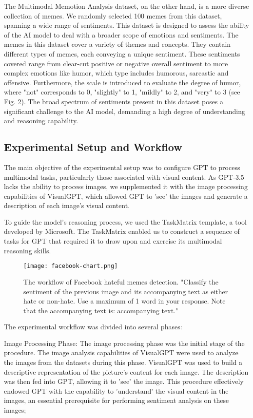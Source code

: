 \documentclass[conference]{IEEEtran}
\begin{document}
The Multimodal Memotion Analysis dataset, on the other hand, is a more diverse collection of memes. We randomly selected 100 memes from this dataset, spanning a wide range of sentiments. This dataset is designed to assess the ability of the AI model to deal with a broader scope of emotions and sentiments. The memes in this dataset cover a variety of themes and concepts. They contain different types of memes, each conveying a unique sentiment. These sentiments covered range from clear-cut positive or negative overall sentiment to more complex emotions like humor, which type includes humorous, sarcastic and offensive. Furthermore, the scale is introduced to evaluate the degree of humor, where "not" corresponds to 0, "slightly" to 1, "mildly" to 2, and "very" to 3 (see Fig. 2). The broad spectrum of sentiments present in this dataset poses a significant challenge to the AI model, demanding a high degree of understanding and reasoning capability.

\subsection{Experimental Setup and Workflow}
 The main objective of the experimental setup was to configure GPT to process multimodal tasks, particularly those associated with visual content. As GPT-3.5 lacks the ability to process images, we supplemented it with the image processing capabilities of VisualGPT, which allowed GPT to 'see' the images and generate a description of each image's visual content.

To guide the model's reasoning process, we used the TaskMatrix template, a tool developed by Microsoft. The TaskMatrix enabled us to construct a sequence of tasks for GPT that required it to draw upon and exercise its multimodal reasoning skills.

\begin{figure}[htbp]
\centerline{\texttt{[image: facebook-chart.png]}}
\caption{The workflow of Facebook hateful memes detection. "Classify the sentiment of the previous image and its accompanying text as either hate or non-hate. Use a maximum of 1 word in your response. Note that the accompanying text is: {accompanying text}."}

\end{figure}


The experimental workflow was divided into several phases: 

Image Processing Phase: The image processing phase was the initial stage of the procedure. The image analysis capabilities of VisualGPT were used to analyze the images from the datasets during this phase. VisualGPT was used to build a descriptive representation of the picture's content for each image. The description was then fed into GPT, allowing it to 'see' the image. This procedure effectively endowed GPT with the capability to 'understand' the visual content in the images, an essential prerequisite for performing sentiment analysis on these images; 
\end{document}
